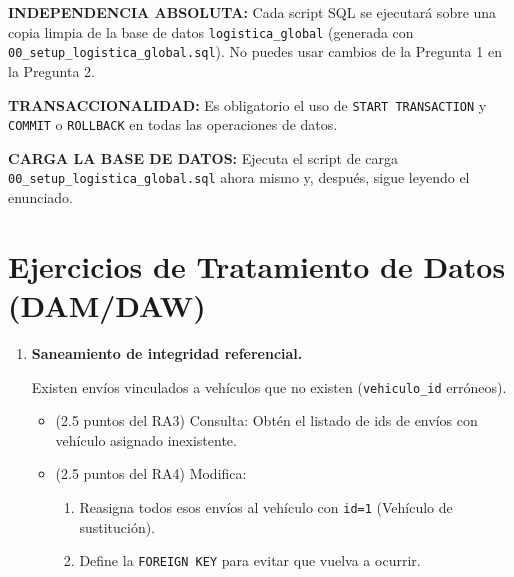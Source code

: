 \documentclass[a4paper,11pt]{article}
\begin{document}
\begin{Form}
\begin{tcolorbox}[colframe=alert, title=INSTRUCCIONES CRÍTICAS]
\textbf{INDEPENDENCIA ABSOLUTA:} Cada script SQL se ejecutará sobre una copia limpia de la base de datos \texttt{logistica\_global} (generada con \texttt{00\_setup\_logistica\_global.sql}). No puedes usar cambios de la Pregunta 1 en la Pregunta 2.
\par\medskip
\textbf{TRANSACCIONALIDAD:} Es obligatorio el uso de \texttt{START TRANSACTION} y \texttt{COMMIT} o \texttt{ROLLBACK} en todas las operaciones de datos.
\par\medskip
\textbf{CARGA LA BASE DE DATOS:} Ejecuta el script de carga \texttt{00\_setup\_logistica\_global.sql} ahora mismo y, después, sigue leyendo el enunciado.
\end{tcolorbox}

\section{Ejercicios de Tratamiento de Datos (DAM/DAW)}

\begin{enumerate}[leftmargin=*, label=\textbf{Pregunta \arabic*:}]



    \item \textbf{Saneamiento de integridad referencial.}

    

   Existen envíos vinculados a vehículos que no existen (\texttt{vehiculo\_id} erróneos).

   \begin{itemize}
    \item (2.5 puntos del RA3) Consulta: Obtén el listado de ids de envíos con vehículo asignado inexistente.
    \item (2.5 puntos del RA4) Modifica: 
    \begin{enumerate}
        \item Reasigna todos esos envíos al vehículo con \texttt{id=1} (Vehículo de sustitución).
        \item Define la \texttt{FOREIGN KEY} para evitar que vuelva a ocurrir.
    \end{enumerate}

\end{itemize}


\end{enumerate}
\end{Form}
\end{document}
